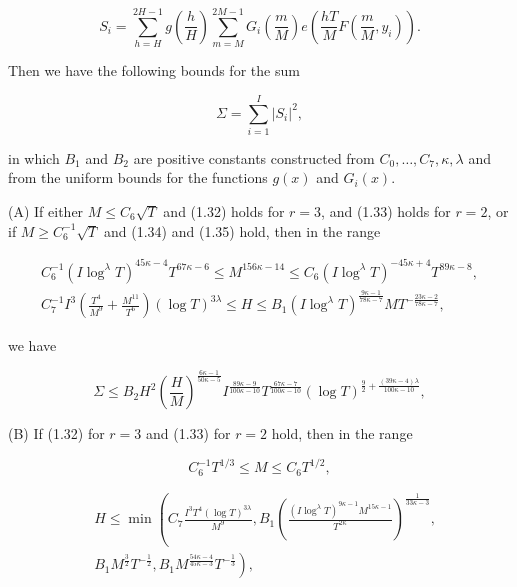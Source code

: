 \documentclass[10pt]{article}
\begin{document}
$$
S_{i}=\sum_{h=H}^{2 H-1} g\left(\frac{h}{H}\right) \sum_{m=M}^{2 M-1} G_{i}\left(\frac{m}{M}\right) e\left(\frac{h T}{M} F\left(\frac{m}{M}, y_{i}\right)\right).
$$

Then we have the following bounds for the sum

$$
\Sigma=\sum_{i=1}^{I}\left|S_{i}\right|^{2},
$$

in which $B_{1}$ and $B_{2}$ are positive constants constructed from $C_{0}, \ldots, C_{7}, \kappa, \lambda$ and from the uniform bounds for the functions $g(x)$ and $G_{i}(x)$.

(A) If either $M \leqslant C_{6} \sqrt{T}$ and (1.32) holds for $r=3$, and (1.33) holds for $r=2$, or if $M \geqslant C_{6}^{-1} \sqrt{T}$ and (1.34) and (1.35) hold, then in the range


\begin{gather*}
C_{6}^{-1}\left(I \log ^{\lambda} T\right)^{45 \kappa-4} T^{67 \kappa-6} \leqslant M^{156 \kappa-14} \leqslant C_{6}\left(I \log ^{\lambda} T\right)^{-45 \kappa+4} T^{89 \kappa-8},  \tag{1.36}\\
C_{7}^{-1} I^{3}\left(\frac{T^{4}}{M^{9}}+\frac{M^{11}}{T^{6}}\right)(\log T)^{3 \lambda} \leqslant H \leqslant B_{1}\left(I \log ^{\lambda} T\right)^{\frac{9 \kappa-1}{78 \kappa-7}} M T^{-\frac{23 \kappa-2}{78 \kappa-7}}, \tag{1.37}
\end{gather*}


we have


\begin{equation*}
\Sigma \leqslant B_{2} H^{2}\left(\frac{H}{M}\right)^{\frac{6 \kappa-1}{50 \kappa-5}} I^{\frac{89 \kappa-9}{100 \kappa-10}} T^{\frac{67 \kappa-7}{100 \kappa-10}}(\log T)^{\frac{9}{2}+\frac{(39 \kappa-4) \lambda}{100 \kappa-10}}, \tag{1.38}
\end{equation*}


(B) If (1.32) for $r=3$ and (1.33) for $r=2$ hold, then in the range


\begin{equation*}
C_{6}^{-1} T^{1 / 3} \leqslant M \leqslant C_{6} T^{1 / 2}, \tag{1.39}
\end{equation*}



\begin{align*}
& H \leqslant \min \left(C_{7} \frac{I^{3} T^{4}(\log T)^{3 \lambda}}{M^{9}}, B_{1}\left(\frac{\left(I \log ^{\lambda} T\right)^{9 \kappa-1} M^{15 \kappa-1}}{T^{2 \kappa}}\right)^{\frac{1}{33 \kappa-3}},\right. \\
&\left.B_{1} M^{\frac{3}{2}} T^{-\frac{1}{2}}, B_{1} M^{\frac{54 \kappa-4}{45 \kappa-3}} T^{-\frac{1}{3}}\right), \tag{1.40}
\end{align*}
\end{document}
